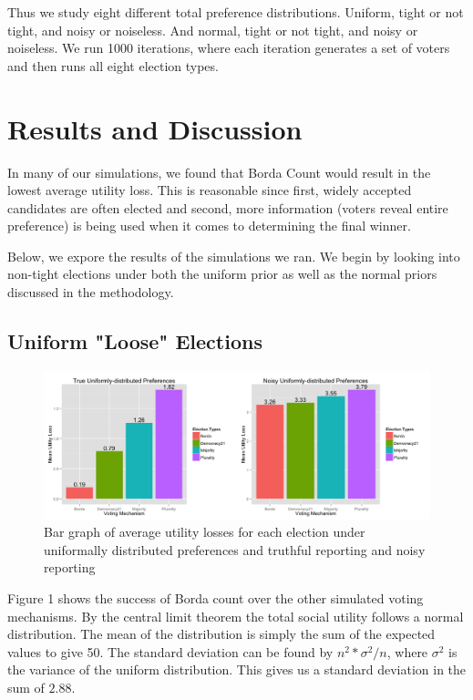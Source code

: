 \documentclass[11pt]{scrartcl}
\begin{document}
Thus we study eight different total preference distributions. Uniform, tight or not tight, and noisy or noiseless. And normal, tight or not tight, and noisy or noiseless. We run 1000 iterations, where each iteration generates a set of voters and then runs all eight election types.

\section{Results and Discussion}

In many of our simulations, we found that Borda Count would result in the lowest average utility loss. This is reasonable since first, widely accepted candidates are often elected and second, more information (voters reveal entire preference) is being used when it comes to determining the final winner.  

Below, we expore the results of the simulations we ran. We begin by looking into non-tight elections under both the uniform prior as well as the normal priors discussed in the methodology.

\subsection{Uniform "Loose" Elections}
\begin{figure}[H]\center
\includegraphics[scale=0.38]{uniform.png}
\caption{Bar graph of average utility losses for each election under uniformally distributed preferences and truthful reporting and noisy reporting}
\end{figure}

Figure 1 shows the success of Borda count over the other simulated voting mechanisms. By the central limit theorem the total social utility follows a normal distribution. The mean of the distribution is simply the sum of the expected values to give 50. The standard deviation can be found by $n^2 * \sigma^2/n$, where $\sigma^2$ is the variance of the uniform distribution. This gives us a standard deviation in the sum of $2.88$.
\end{document}
